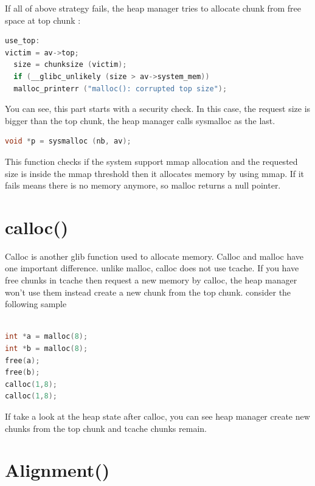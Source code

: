 \documentclass{masterthesis}
\newcommand*\tch{tcache}
\begin{document}
If all of above strategy fails, the heap manager tries to allocate chunk from free space at top chunk :
\begin{lstlisting}[language=c,frame=tlrb]
use_top:
victim = av->top;
  size = chunksize (victim);
  if (__glibc_unlikely (size > av->system_mem))
  malloc_printerr ("malloc(): corrupted top size");
\end{lstlisting}
You can see, this part starts with a security check. In this case, the request size is bigger than the top chunk, the heap manager calls sysmalloc as the last.
\begin{lstlisting}[language=c,frame=tlrb]
 void *p = sysmalloc (nb, av);
 \end{lstlisting}
This function checks if the system support mmap allocation and the requested size is inside the mmap threshold then it allocates memory by using mmap. If it fails means there is no memory anymore, so malloc returns a null pointer.
\section{calloc()}
Calloc is another glib function used to allocate memory. Calloc and malloc have one important difference. unlike malloc, calloc does not use \tch{}. If you have free chunks in \tch{} then request a new memory by calloc, the heap manager won't use them instead create a new chunk from the top chunk. consider the following sample 
\begin{lstlisting}[language=c,frame=tlrb]

int *a = malloc(8);
int *b = malloc(8);
free(a);
free(b);
calloc(1,8);
calloc(1,8);
\end{lstlisting}
If take a look at the heap state after calloc, you can see heap manager create new chunks from the top chunk and \tch{} chunks remain.

\section{Alignment()}
\end{document}

